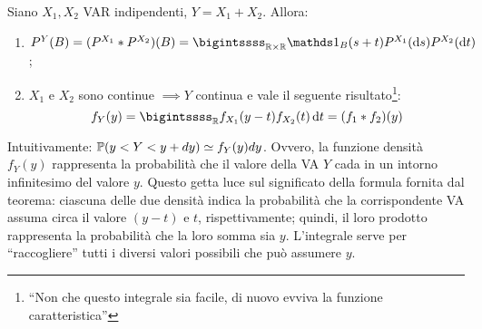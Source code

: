 \medskip
\begin{teob}[\JPTh{15.1,15.3}]
  Siano $X_1, X_2$ VAR indipendenti, $Y = X_1 + X_2$. Allora:
  \begin{enumerate}
    \item $P^Y(B) = (P^{X_1} \ast P^{X_2})(B) = \bigintssss_{\RR \times \RR} \Ind_B (s+t) P^{X_1}(\de s) P^{X_2}(\de t)$;
    \item $X_1$ e $X_2$ sono continue $\implies Y$ continua e vale il seguente risultato\footnote{``Non che questo integrale sia facile, di nuovo evviva la funzione caratteristica''}:
      $$f_Y(y) = \bigintssss_{\RR} f_{X_1} (y-t) f_{X_2} (t) \, \de t = (f_1 \ast f_2) (y)$$
  \end{enumerate}
\end{teob}

Intuitivamente: $\mathbb P (y < Y < y+dy)\simeq f_Y(y)dy$. Ovvero, la funzione densità $f_Y(y)$ rappresenta la probabilità che il valore della VA $Y$ cada in un intorno infinitesimo del valore $y$. Questo getta luce sul significato della formula fornita dal teorema: ciascuna delle due densità indica la probabilità che la corrispondente VA assuma circa il valore $(y-t)$ e $t$, rispettivamente; quindi, il loro prodotto rappresenta la probabilità che la loro somma sia $y$. L'integrale serve per ``raccogliere'' tutti i diversi valori possibili che può assumere $y$.
\cleardoublepage
